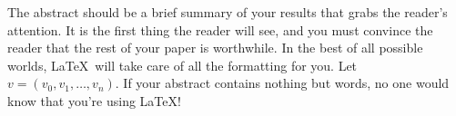 
The abstract should be a brief summary of your results that grabs the
reader's attention.  It is the first thing the reader will see, and you
must convince the reader that the rest of your paper is worthwhile.  In
the best of all possible worlds, \LaTeX\ will take care of all the
formatting for you.  Let $v = (v_0, v_1, \ldots, v_n)$.  If your
abstract contains nothing but words, no one would know that you're using
\LaTeX!

